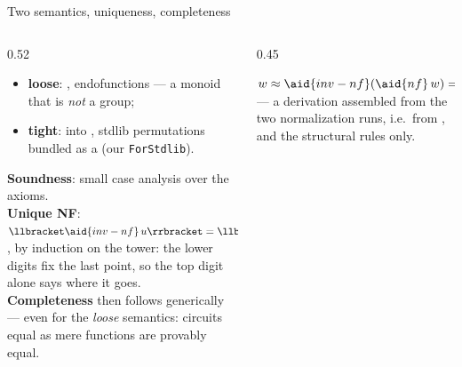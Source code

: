 \begin{frame}{Two semantics, uniqueness, completeness \InPaper}
\begin{columns}[c]
\begin{column}{0.52\textwidth}
\begin{itemize}
  \setlength{\itemsep}{4pt}
  \item \textbf{loose}: , endofunctions
        --- a monoid that is \emph{not} a group;
  \item \textbf{tight}: into , stdlib permutations
        bundled as a  (our \texttt{ForStdlib}).
\end{itemize}
\vspace{4pt}
\textbf{Soundness}: small case analysis over the axioms.\\
\textbf{Unique NF}: $\llbracket \aid{inv-nf}\,u\rrbracket = \llbracket\aid{inv-nf}\,v\rrbracket \Rightarrow u\equiv v$,
by induction on the tower: the lower digits fix the last point, so the top digit alone
says where it goes.\\
\textbf{Completeness} then follows generically --- even for the \emph{loose}
semantics: circuits equal as mere functions are provably equal.
\end{column}
\begin{column}{0.45\textwidth}
\centering
{}

\vspace{6pt}
{\small $w \approx \aid{inv-nf}(\aid{nf}\,w) = \aid{inv-nf}(\aid{nf}\,v)\approx v$ ---
a derivation assembled from the two normalization runs, i.e.\ from
,  and the structural rules only.}
\end{column}
\end{columns}
\end{frame}

